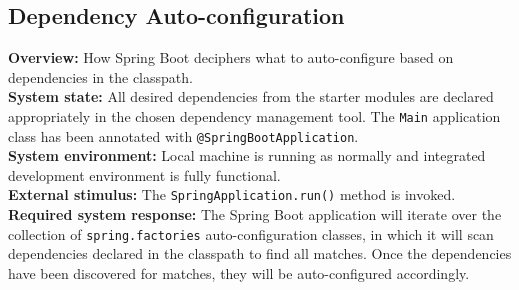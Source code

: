 \subsection*{Dependency Auto-configuration}

\textbf{Overview:} How Spring Boot deciphers what to auto-configure based on dependencies in the classpath.\\

\textbf{System state:} All desired dependencies from the starter modules are declared appropriately in the chosen dependency management tool. The \texttt{Main} application class has been annotated with \texttt{@SpringBootApplication}. \\

\textbf{System environment:} Local machine is running as normally and integrated development environment is fully functional. \\

\textbf{External stimulus:} The \texttt{SpringApplication.run()} method is invoked. \\

\textbf{Required system response:} The Spring Boot application will iterate over the collection of \texttt{spring.factories} auto-configuration classes, in which it will scan dependencies declared in the classpath to find all matches. Once the dependencies have been discovered for matches, they will be auto-configured accordingly.